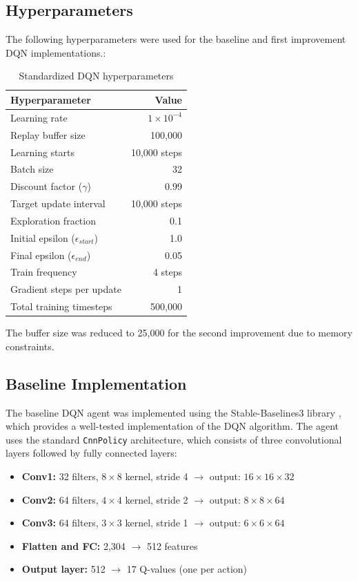 \documentclass[twocolumn]{article}
\begin{document}
\subsection*{Hyperparameters}
The following hyperparameters were used for the baseline and first improvement DQN implementations.:

\begin{table}[H]
\centering
\begin{tabular}{lr}
\toprule
\textbf{Hyperparameter} & \textbf{Value} \\
\midrule
Learning rate & $1 \times 10^{-4}$ \\
Replay buffer size & 100,000 \\
Learning starts & 10,000 steps \\
Batch size & 32 \\
Discount factor ($\gamma$) & 0.99 \\
Target update interval & 10,000 steps \\
Exploration fraction & 0.1 \\
Initial epsilon ($\epsilon_{start}$) & 1.0 \\
Final epsilon ($\epsilon_{end}$) & 0.05 \\
Train frequency & 4 steps \\
Gradient steps per update & 1 \\
Total training timesteps & 500,000 \\
\bottomrule
\end{tabular}
\caption{Standardized DQN hyperparameters}
\end{table}
The buffer size was reduced to 25,000 for the second improvement due to memory constraints.

\subsection*{Baseline Implementation}

The baseline DQN agent was implemented using the Stable-Baselines3 library \parencite{stable-baselines3}, which provides a well-tested implementation of the DQN algorithm. The agent uses the standard \texttt{CnnPolicy} architecture, which consists of three convolutional layers followed by fully connected layers:

\begin{itemize}
    \item \textbf{Conv1:} 32 filters, $8 \times 8$ kernel, stride 4 $\rightarrow$ output: $16 \times 16 \times 32$
    \item \textbf{Conv2:} 64 filters, $4 \times 4$ kernel, stride 2 $\rightarrow$ output: $8 \times 8 \times 64$
    \item \textbf{Conv3:} 64 filters, $3 \times 3$ kernel, stride 1 $\rightarrow$ output: $6 \times 6 \times 64$
    \item \textbf{Flatten and FC:} 2,304 $\rightarrow$ 512 features
    \item \textbf{Output layer:} 512 $\rightarrow$ 17 Q-values (one per action)
\end{itemize}
\end{document}

